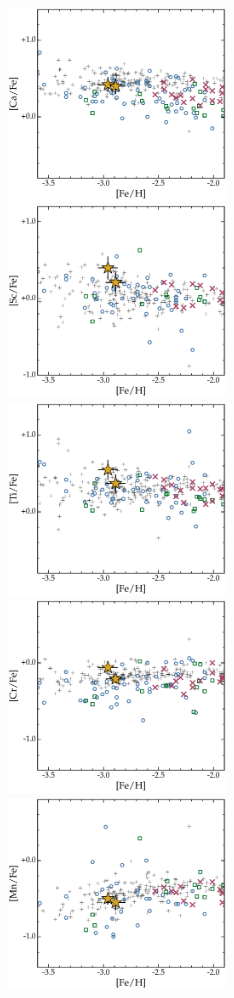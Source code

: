 \documentclass[twocolumn,tighten]{aastex62}
\begin{document}
\begin{figure}
\begin{center}
\includegraphics[angle=0,width=2.27in]{fig3e.pdf} 
\hspace*{0.02in}
\includegraphics[angle=0,width=2.27in]{fig3f.pdf} \\
\vspace*{-0.231in}
\includegraphics[angle=0,width=2.27in]{fig3g.pdf}
\hspace*{0.02in}
\includegraphics[angle=0,width=2.27in]{fig3h.pdf} 
\hspace*{0.02in}
\includegraphics[angle=0,width=2.27in]{fig3i.pdf} \\

\end{center}
\end{figure}
\end{document}
